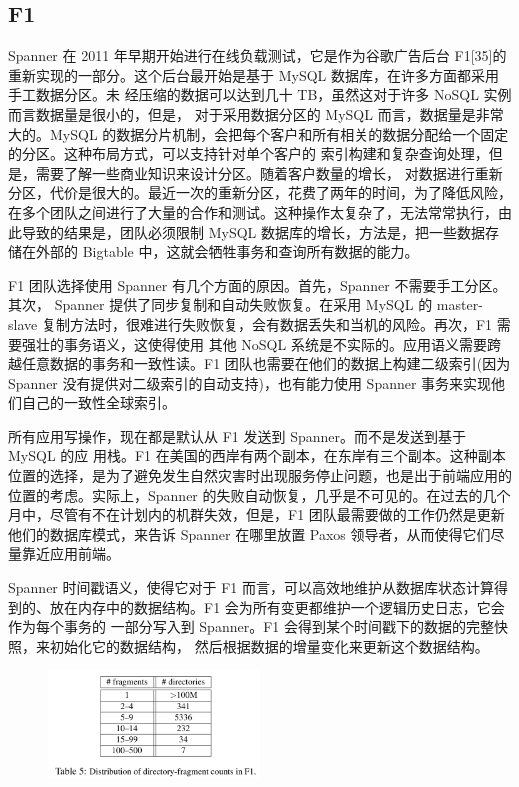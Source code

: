 \documentclass[letterpaper,twocolumn,10pt]{article}
\begin{document}
\subsection{F1}
Spanner 在 2011 年早期开始进行在线负载测试，它是作为谷歌广告后台 F1[35]的重新实现的一部分。这个后台最开始是基于 MySQL 数据库，在许多方面都采用手工数据分区。未 经压缩的数据可以达到几十 TB，虽然这对于许多 NoSQL 实例而言数据量是很小的，但是， 对于采用数据分区的 MySQL 而言，数据量是非常大的。MySQL 的数据分片机制，会把每个客户和所有相关的数据分配给一个固定的分区。这种布局方式，可以支持针对单个客户的 索引构建和复杂查询处理，但是，需要了解一些商业知识来设计分区。随着客户数量的增长， 对数据进行重新分区，代价是很大的。最近一次的重新分区，花费了两年的时间，为了降低风险，在多个团队之间进行了大量的合作和测试。这种操作太复杂了，无法常常执行，由此导致的结果是，团队必须限制 MySQL 数据库的增长，方法是，把一些数据存储在外部的 Bigtable 中，这就会牺牲事务和查询所有数据的能力。

F1 团队选择使用 Spanner 有几个方面的原因。首先，Spanner 不需要手工分区。其次， Spanner 提供了同步复制和自动失败恢复。在采用 MySQL 的 master-slave 复制方法时，很难进行失败恢复，会有数据丢失和当机的风险。再次，F1 需要强壮的事务语义，这使得使用 其他 NoSQL 系统是不实际的。应用语义需要跨越任意数据的事务和一致性读。F1 团队也需要在他们的数据上构建二级索引(因为 Spanner 没有提供对二级索引的自动支持)，也有能力使用 Spanner 事务来实现他们自己的一致性全球索引。

所有应用写操作，现在都是默认从 F1 发送到 Spanner。而不是发送到基于 MySQL 的应 用栈。F1 在美国的西岸有两个副本，在东岸有三个副本。这种副本位置的选择，是为了避免发生自然灾害时出现服务停止问题，也是出于前端应用的位置的考虑。实际上，Spanner 的失败自动恢复，几乎是不可见的。在过去的几个月中，尽管有不在计划内的机群失效，但是，F1 团队最需要做的工作仍然是更新他们的数据库模式，来告诉 Spanner 在哪里放置 Paxos 领导者，从而使得它们尽量靠近应用前端。

Spanner 时间戳语义，使得它对于 F1 而言，可以高效地维护从数据库状态计算得到的、放在内存中的数据结构。F1 会为所有变更都维护一个逻辑历史日志，它会作为每个事务的 一部分写入到 Spanner。F1 会得到某个时间戳下的数据的完整快照，来初始化它的数据结构， 然后根据数据的增量变化来更新这个数据结构。

\begin{figure}[htbp]
\begin{center}
\includegraphics[width=0.5\textwidth]{./table_5.png}
\label{Table5}
\end{center}
\end{figure}
\end{document}
